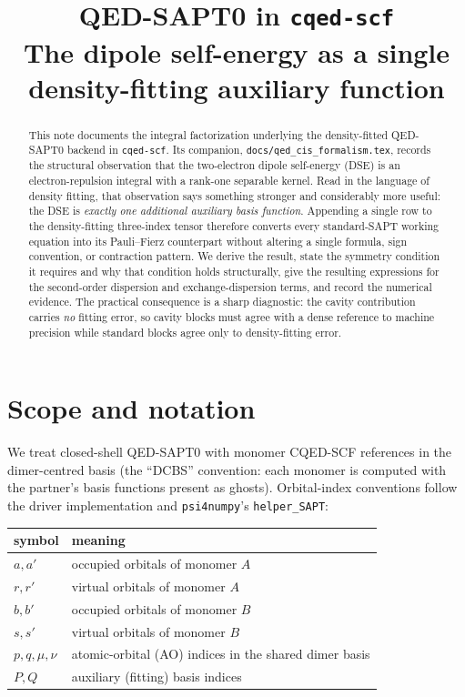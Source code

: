 \documentclass[11pt]{article}
\title{\textbf{QED-SAPT0 in \texttt{cqed-scf}}\\[2pt]
\large The dipole self-energy as a single density-fitting auxiliary function}
\author{}
\date{}
\begin{document}
\maketitle
\vspace{-3em}

\begin{abstract}
\noindent
This note documents the integral factorization underlying the density-fitted
QED-SAPT0 backend in \texttt{cqed-scf}. Its companion,
\texttt{docs/qed\_cis\_formalism.tex}, records the structural observation that
the two-electron dipole self-energy (DSE) is an electron-repulsion integral
with a rank-one separable kernel. Read in the language of density fitting, that
observation says something stronger and considerably more useful: the DSE is
\emph{exactly one additional auxiliary basis function}. Appending a single row
to the density-fitting three-index tensor therefore converts every
standard-SAPT working equation into its Pauli--Fierz counterpart without
altering a single formula, sign convention, or contraction pattern. We derive
the result, state the symmetry condition it requires and why that condition
holds structurally, give the resulting expressions for the second-order
dispersion and exchange-dispersion terms, and record the numerical evidence.
The practical consequence is a sharp diagnostic: the cavity contribution
carries \emph{no} fitting error, so cavity blocks must agree with a dense
reference to machine precision while standard blocks agree only to
density-fitting error.
\end{abstract}

\tableofcontents
\bigskip

\section{Scope and notation}
\label{sec:scope}

We treat closed-shell QED-SAPT0 with monomer CQED-SCF references in the
dimer-centred basis (the ``DCBS'' convention: each monomer is computed with the
partner's basis functions present as ghosts). Orbital-index conventions follow
the driver implementation and \texttt{psi4numpy}'s \texttt{helper\_SAPT}:

\begin{center}
\small
\begin{tabular}{ll}
\toprule
symbol & meaning \\
\midrule
$a, a'$ & occupied orbitals of monomer $A$ \\
$r, r'$ & virtual orbitals of monomer $A$ \\
$b, b'$ & occupied orbitals of monomer $B$ \\
$s, s'$ & virtual orbitals of monomer $B$ \\
$p,q,\mu,\nu$ & atomic-orbital (AO) indices in the shared dimer basis \\
$P, Q$ & auxiliary (fitting) basis indices \\
\bottomrule
\end{tabular}
\end{center}
\end{document}

